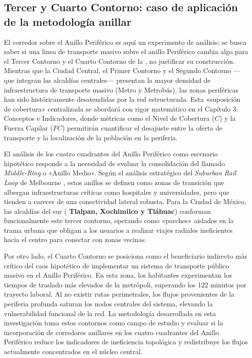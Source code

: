 \subsection{Tercer y Cuarto Contorno: caso de aplicación de la metodología anillar} 
\label{subsec:beneficiarios-contornos}
El corredor sobre el Anillo Periférico es aquí un experimento de análisis; se
busca saber si una linea de transporte masivo sobre el anillo Periférico
cambia algo para el Tercer Contorno  y el
Cuarto Contorno  de la \zmvm{}, no justificar su
construcción. Mientras que la Ciudad Central, el Primer Contorno y el Segundo
Contorno —que integran las alcaldías centrales— presentan la mayor densidad de
infraestructura de transporte masivo (Metro y Metrobús), las zonas periféricas
han sido históricamente desatendidas por la red estructurada. Esta «suposición
de cobertura» centralizada se abordará con rigor matemático en el Capítulo 3:
Conceptos e Indicadores, donde métricas como el Nivel de Cobertura ($C$) y la
Fuerza Capilar ($FC$) permitirán cuantificar el desajuste entre la oferta de
transporte y la localización de la población en la periferia.

El análisis de los cuatro cuadrantes del Anillo Periférico como escenario
hipotético responde a la necesidad de evaluar la consolidación del llamado
\textit{Middle-Ring} o «Anillo Medio». Según el análisis estratégico del
\textit{Suburban Rail Loop} de Melbourne \citep{suburbanrailloop2021}, estos
anillos se definen como zonas de transición que albergan infraestructuras
críticas como hospitales y universidades, pero que tienden a carecer de una
conectividad lateral robusta. Para la Ciudad de México, las alcaldías del sur (
\textbf{Tlalpan, Xochimilco y Tláhuac}) conforman funcionalmente este tercer
contorno, operando como «parches» aislados en la trama urbana que obligan a los
usuarios a realizar viajes radiales ineficientes hacia el centro para conectar
con zonas vecinas.

Por otro lado, el Cuarto Contorno se posiciona como el beneficiario indirecto
más crítico del caos hipotético de implementar un sistema de transporte público
masivo en el Anillo Periférico. En esta zona, los habitantes experimentan los tiempos de traslado
más elevados de la metrópoli, superando los 122 minutos por trayecto laboral. Al
no existir rutas perimetrales, los flujos provenientes de la periferia profunda
saturan los nodos centrales del sistema, elevando la vulnerabilidad funcional de
la red. La metodología desarrollada en esta investigación toma estos contornos
como campo de estudio y evaluar si la incorporación de corredores anillares
en los cuatro cuadrantes del Anillo Periférico reduce los indicadores de
ineficiencia topológica \citep{suburbanrailloop2021} y redistribuye los flujos
actualmente concentrados en el núcleo central.

